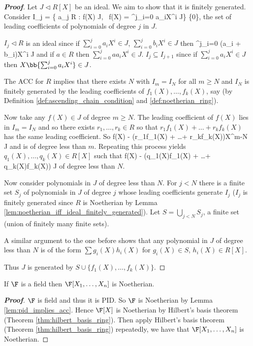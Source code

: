 \begin{proof}[\bf Proof]
Let $J \lhd R[X]$ be an ideal. We aim to show that it is finitely generated. Consider
\be
I_j = \left\{ a_j \in R : \exists f(X) \in J, \ f(X) = \sum^j_{i=0} a_iX^i \in J\right\} \cup \{0\},
\ee
the set of leading coefficients of polynomials of degree $j$ in $J$.

$I_j \lhd R$ is an ideal since if $\sum^j_{i=0} a_iX^i \in J$, $\sum^j_{i=0} b_iX^i \in J$ then
\be
\sum^j_{i=0} (a_i + b_i)X^i \in J
\ee
and if $a \in R$ then $\sum^j_{i=0} aa_iX^i \in J$. $I_j \subseteq I_{j+1}$ since if $\sum^j_{i=0} a_iX^i \in J$ then $X \bb{\sum^j_{i=0} a_iX^i} \in J$.

The ACC for $R$ implies that there exists $N$ with $I_m = I_N$ for all $m \geq N$ and $I_N$ is finitely generated by the leading coefficients of $f_1(X),\dots , f_k(X)$, say (by Definition \ref{def:ascending_chain_condition} and \ref{def:noetherian_ring}).

Now take any $f(X) \in J$ of degree $m \geq N$. The leading coefficient of $f(X)$ lies in $I_m = I_N$ and so there exists $r_1,\dots,r_k \in R$ so that $r_1f_1(X) + \dots + r_kf_k(X)$ has the same leading coefficient. So
\be
f(X) - (r_1f_1(X) + \dots + r_kf_k(X))X^{m-N} \in J
\ee
and is of degree less than $m$. Repeating this process yields $q_1(X),\dots , q_k(X) \in R[X]$ such that
\be
f(X) - (q_1(X)f_1(X) + \dots + q_k(X)f_k(X)) \in J
\ee
of degree less than $N$.

Now consider polynomials in $J$ of degree less than $N$. For $j < N$ there is a finite set $S_j$ of polynomials in $J$ of degree $j$ whose leading coefficients generate $I_j$ ($I_j$ is finitely generated since $R$ is Noetherian by Lemma \ref{lem:noetherian_iff_ideal_finitely_generated}). Let $S = \bigcup_{j<N} S_j$, a finite set (union of finitely many finite sets).

A similar argument to the one before shows that any polynomial in $J$ of degree less than $N$ is of the form $\sum g_i(X)h_i(X)$ for $g_i(X) \in S$, $h_i(X) \in R[X]$.

Thus $J$ is generated by $S \cup \{f_1(X),\dots,f_k(X)\}$.
\end{proof}

\begin{corollary}
If $\F$ is a field then $\F[X_1,\dots ,X_n]$ is Noetherian.
\end{corollary}

\begin{proof}[\bf Proof]
$\F$ is field and thus it is PID. So $\F$ is Noetherian by Lemma \ref{lem:pid_implies_acc}. Hence $\F[X]$ is Noetherian by Hilbert's basis theorem (Theorem \ref{thm:hilbert_basis_ring}). Then apply Hilbert's basis theorem (Theorem \ref{thm:hilbert_basis_ring}) repeatedly, we have that $\F[X_1,\dots ,X_n]$ is Noetherian.
\end{proof}


